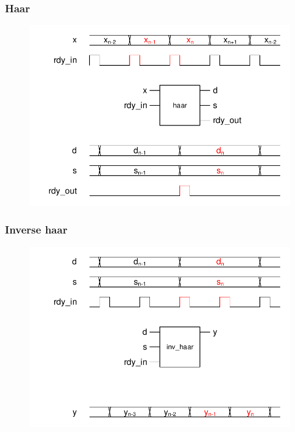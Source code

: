 \documentclass[english, aspectratio=169]{beamer}
\begin{document}
\begin{frame}
\frametitle{Haar}

	\begin{figure}
		\includegraphics[scale=0.7]{haar.pdf}
	\end{figure}

\end{frame}

\begin{frame}
\frametitle{Inverse haar}

	\begin{figure}
		\includegraphics[scale=0.7]{inv_haar.pdf}
	\end{figure}

\end{frame}
\end{document}
